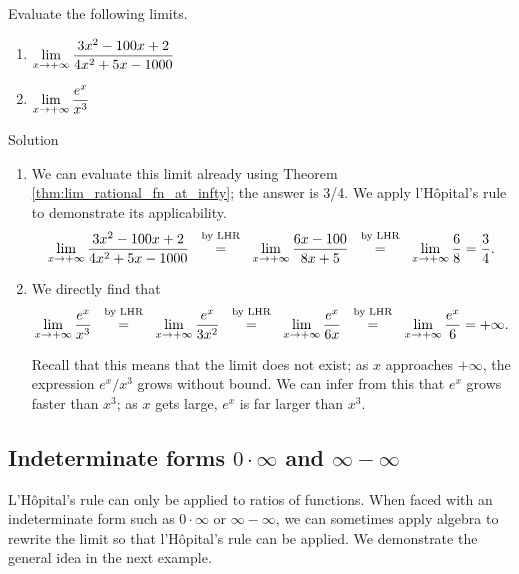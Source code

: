 \begin{example}\label{ex_LHR2}
Evaluate the following limits.

\begin{multicols}{2}
\begin{enumerate}
\item $\displaystyle \lim_{x\to+\infty} \frac{3x^2-100x+2}{4x^2+5x-1000}$
\item $\displaystyle\lim_{x\to+\infty}\frac{e^x}{x^3}$
\end{enumerate}
\end{multicols}

Solution 

\begin{enumerate}
\item		We can evaluate this limit already using Theorem \ref{thm:lim_rational_fn_at_infty}; the answer is 3/4. We apply l'H\^opital's rule to demonstrate its applicability.
$$\lim_{x\to+\infty} \frac{3x^2-100x+2}{4x^2+5x-1000}\stackrel{\ \text{ by LHR \rule[-5pt]{0pt}{3pt}} \ }{=} \lim_{x\to+\infty} \frac{6x-100}{8x+5} \stackrel{\ \text{ by LHR \rule[-5pt]{0pt}{3pt}} \ }{=} \lim_{x\to+\infty} \frac68 = \frac34.$$

\item We directly find that
$$\ds \lim_{x\to+\infty}\frac{e^x}{x^3} \stackrel{\ \text{ by LHR \rule[-5pt]{0pt}{3pt}} \ }{=} \lim_{x\to+\infty} \frac{e^x}{3x^2} \stackrel{\ \text{ by LHR \rule[-5pt]{0pt}{3pt}} \ }{=} \lim_{x\to+\infty} \frac{e^x}{6x} \stackrel{\ \text{ by LHR \rule[-5pt]{0pt}{3pt}} \ }{=} \lim_{x\to+\infty} \frac{e^x}{6} =+\infty.$$

Recall that this means that the limit does not exist; as $x$ approaches $+\infty$, the expression $e^x/x^3$ grows without bound. We can infer from this that $e^x$ grows faster than $x^3$; as $x$ gets large, $e^x$ is far larger than $x^3$.
\end{enumerate}
\end{example}


\subsection{Indeterminate forms $0\cdot\infty$ and $\infty-\infty$}


L'H\^opital's rule can only be applied to ratios of functions. When faced with an indeterminate form such as $0\cdot\infty$ or $\infty-\infty$, we can sometimes apply algebra to rewrite the limit so that l'H\^opital's rule can be applied. We demonstrate the general idea in the next example.


